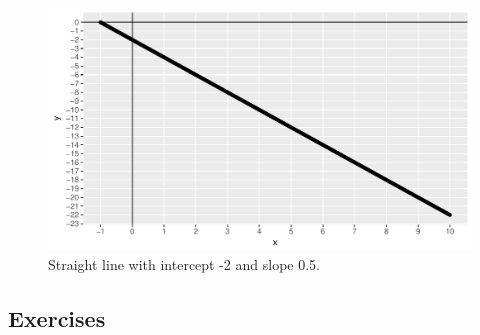 \documentclass[]{report}\usepackage[]{graphicx}\usepackage[]{color}
\makeatletter
\def\maxwidth{ %
  \ifdim\Gin@nat@width>\linewidth
    \linewidth
  \else
    \Gin@nat@width
  \fi
}
\newenvironment{knitrout}{}{} %
\makeatother
\begin{document}
\begin{knitrout}
\color{fgcolor}\begin{figure}

{\centering \includegraphics[width=\maxwidth]{figure/lm_3-1} 

}

\caption[Straight line with intercept -2 and slope 0.5]{Straight line with intercept -2 and slope 0.5.}\label{fig:lm_3}
\end{figure}


\end{knitrout}

\subsection{Exercises}
\end{document}
